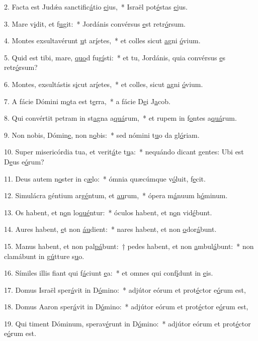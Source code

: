 2. Facta est Judǽa sanctific\uline{á}tio \uline{e}jus,~* Israël pot\uline{é}stas \uline{e}jus.\par 
3. Mare v\uline{i}dit, et f\uline{u}git:~* Jordánis convérsus \uline{e}st retr\uline{ó}rsum.\par 
4. Montes exsultavérunt \uline{u}t ar\uline{í}etes,~* et colles sicut \uline{a}gni \uline{ó}vium.\par 
5. Quid est tibi, mare, \uline{quo}d fug\uline{í}sti:~* et tu, Jordánis, quia convérsus \uline{e}s retr\uline{ó}rsum?\par 
6. Montes, exsultástis s\uline{i}cut ar\uline{í}etes,~* et colles, sicut \uline{a}gni \uline{ó}vium.\par 
7. A fácie Dómini m\uline{o}ta est t\uline{e}rra,~* a fácie D\uline{e}i J\uline{a}cob.\par 
8. Qui convértit petram in st\uline{a}gna a\uline{quá}rum,~* et rupem in f\uline{o}ntes a\uline{quá}rum.\par 
9. Non nobis, Dómin\uline{e}, non n\uline{o}bis:~* sed nómini t\uline{u}o da gl\uline{ó}riam.\par 
10. Super misericórdia tua, et verit\uline{á}te t\uline{u}a:~* nequándo dicant gentes: Ubi est D\uline{e}us e\uline{ó}rum?\par 
11. Deus autem n\uline{o}ster in c\uline{æ}lo:~* ómnia quæcúmque v\uline{ó}luit, f\uline{e}cit.\par 
12. Simulácra géntium arg\uline{é}ntum, et \uline{au}rum,~* ópera m\uline{á}nuum h\uline{ó}minum.\par 
13. Os habent, et n\uline{o}n lo\uline{qué}ntur:~* óculos habent, et n\uline{o}n vid\uline{é}bunt.\par 
14. Aures habent, \uline{e}t non \uline{áu}dient:~* nares habent, et non \uline{o}dor\uline{á}bunt.\par 
15. Manus habent, et non pal\uline{pá}bunt:~† pedes habent, et non \uline{a}mbul\uline{á}bunt:~* non clamábunt in g\uline{ú}tture s\uline{u}o.\par 
16. Símiles illis fiant qui f\uline{á}ciunt \uline{e}a:~* et omnes qui conf\uline{í}dunt in \uline{e}is.\par 
17. Domus Israël sper\uline{á}vit in D\uline{ó}mino:~* adjútor eórum et prot\uline{é}ctor e\uline{ó}rum est,\par 
18. Domus Aaron sper\uline{á}vit in D\uline{ó}mino:~* adjútor eórum et prot\uline{é}ctor e\uline{ó}rum est,\par 
19. Qui timent Dóminum, sperav\uline{é}runt in D\uline{ó}mino:~* adjútor eórum et prot\uline{é}ctor e\uline{ó}rum est.\par 
